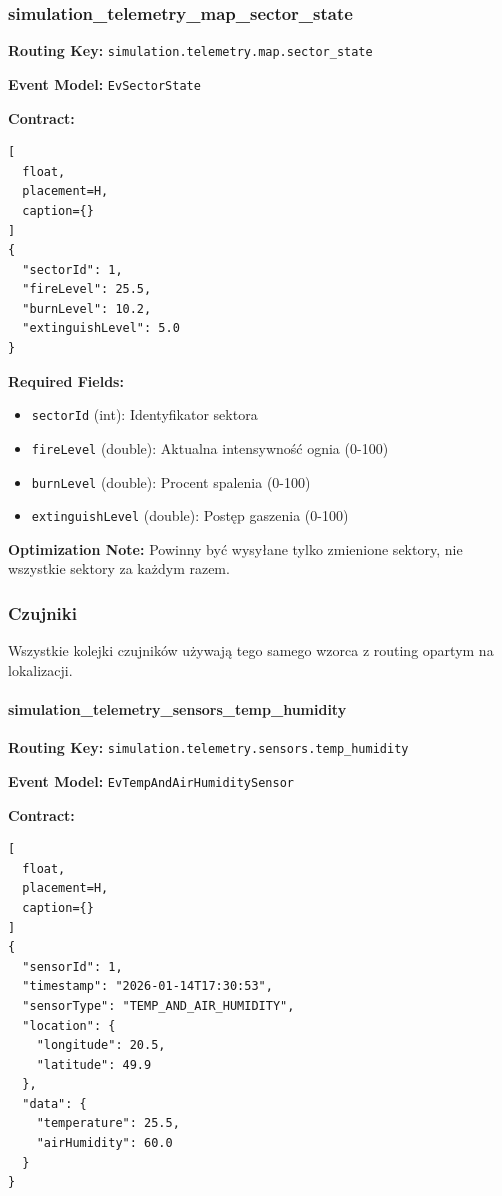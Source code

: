 \documentclass[11pt,a4paper] {article}
\begin{document}
\subsubsection{simulation\_telemetry\_map\_sector\_state}

\textbf{Routing Key:} \texttt{simulation.telemetry.map.sector\_state}

\textbf{Event Model:} \texttt{EvSectorState}

\textbf{Contract:}
\begin{lstlisting}[
  float,
  placement=H,
  caption={}
]
{
  "sectorId": 1,
  "fireLevel": 25.5,
  "burnLevel": 10.2,
  "extinguishLevel": 5.0
}
\end{lstlisting}

\textbf{Required Fields:}
\begin{itemize}
    \item \texttt{sectorId} (int): Identyfikator sektora
    \item \texttt{fireLevel} (double): Aktualna intensywność ognia (0-100)
    \item \texttt{burnLevel} (double): Procent spalenia (0-100)
    \item \texttt{extinguishLevel} (double): Postęp gaszenia (0-100)
\end{itemize}

\textbf{Optimization Note:} Powinny być wysyłane tylko zmienione sektory, nie wszystkie sektory za każdym razem.

\subsubsection{Czujniki}

Wszystkie kolejki czujników używają tego samego wzorca z routing opartym na lokalizacji.

\paragraph{simulation\_telemetry\_sensors\_temp\_humidity}

\textbf{Routing Key:} \texttt{simulation.telemetry.sensors.temp\_humidity}

\textbf{Event Model:} \texttt{EvTempAndAirHumiditySensor}

\textbf{Contract:}
\begin{lstlisting}[
  float,
  placement=H,
  caption={}
] 
{
  "sensorId": 1,
  "timestamp": "2026-01-14T17:30:53",
  "sensorType": "TEMP_AND_AIR_HUMIDITY",
  "location": {
    "longitude": 20.5,
    "latitude": 49.9
  },
  "data": {
    "temperature": 25.5,
    "airHumidity": 60.0
  }
}
\end{lstlisting}
\end{document}
